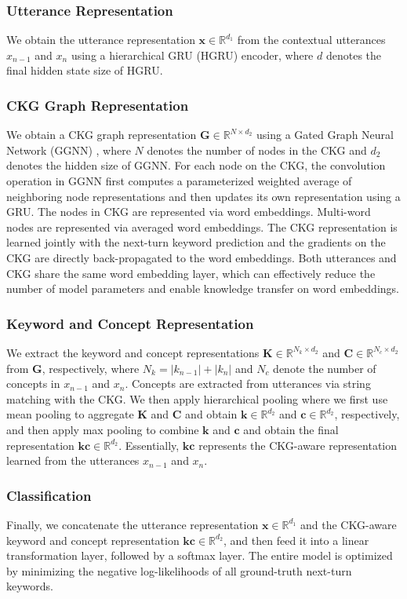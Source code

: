 \documentclass[letterpaper]{article} %
\begin{document}
\subsubsection{Utterance Representation}
We obtain the utterance representation $\mathbf{x} \in \mathbb{R}^{d_1}$ from the contextual utterances $x_{n-1}$ and $x_{n}$ using a hierarchical GRU (HGRU) encoder, where $d$ denotes the final hidden state size of HGRU. 
\subsubsection{CKG Graph Representation}
We obtain a CKG graph representation $\mathbf{G} \in \mathbb{R}^{N\times d_2}$ using a Gated Graph Neural Network (GGNN) \cite{li2016gated}, where $N$ denotes the number of nodes in the CKG and $d_2$ denotes the hidden size of GGNN. For each node on the CKG, the convolution operation in GGNN first computes a parameterized weighted average of neighboring node representations and then updates its own representation using a GRU. The nodes in CKG are represented via word embeddings. Multi-word nodes are represented via averaged word embeddings. The CKG representation is learned jointly with the next-turn keyword prediction and the gradients on the CKG are directly back-propagated to the word embeddings. Both utterances and CKG share the same word embedding layer, which can effectively reduce the number of model parameters and enable knowledge transfer on word embeddings.
\subsubsection{Keyword and Concept Representation}
We extract the keyword and concept representations $\mathbf{K} \in \mathbb{R}^{N_k \times d_2}$ and $\mathbf{C} \in \mathbb{R}^{N_c \times d_2}$ from $\mathbf{G}$, respectively, where $N_k = |k_{n-1}| + |k_{n}|$ and $N_c$ denote the number of concepts in $x_{n-1}$ and $x_{n}$. Concepts are extracted from utterances via string matching with the CKG. We then apply hierarchical pooling where we first use mean pooling to aggregate $\textbf{K}$ and $\textbf{C}$ and obtain $\textbf{k} \in \mathbb{R}^{d_2}$ and $\textbf{c} \in \mathbb{R}^{d_2}$, respectively, and then apply max pooling to combine $\textbf{k}$ and $\textbf{c}$ and obtain the final representation $\mathbf{kc} \in \mathbb{R}^{d_2}$. Essentially,  $\mathbf{kc}$ represents the CKG-aware representation learned from the utterances $x_{n-1}$ and $x_{n}$.
\subsubsection{Classification}
Finally, we concatenate the utterance representation $\mathbf{x} \in \mathbb{R}^{d_1}$ and the CKG-aware keyword and concept representation $\mathbf{kc} \in \mathbb{R}^{d_2}$, and then feed it into a linear transformation layer, followed by a softmax layer. The entire model is optimized by minimizing the negative log-likelihoods of all ground-truth next-turn keywords. 
\end{document}
